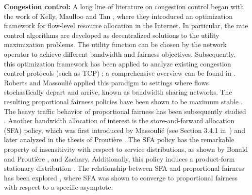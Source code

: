 \documentclass[ssy,preprint]{imsart_axv}
\numberwithin{equation}{section}
\theoremstyle{plain}
\theoremstyle{definition}
\theoremstyle{remark}
\theoremstyle{plain}
\theoremstyle{plain}
\begin{document}
\medskip
\noindent\textbf{Congestion control:} A long line of literature on congestion
control began with the work of Kelly, Maulloo and Tan \cite{kelly1998rate}, where they
introduced an optimization framework for flow-level resource allocation in
the Internet. In particular, the rate control algorithms are developed
as decentralized solutions to the utility maximization problems. The
utility function can be chosen by the network operator to achieve
different bandwidth and fairness objectives. Subsequently, this optimization
framework has been applied to analyze existing congestion control
protocols (such as TCP) \cite{low2002vegas,low2002internet,mo2000fair}; a
comprehensive overview can be found in  \cite{srikant_book}.
Roberts and Massouli\'{e} \cite{massoulie2000bandwidth} applied this
paradigm to settings where flows stochastically depart and arrive,
known as bandwidth sharing networks. The resulting proportional fairness
policies have been shown to be maximum stable \cite{bonald2001fairness,massoulie2007fairness}.
The heavy traffic behavior of proportional fairness has been subsequently
studied \cite{shah2014qualitative,kang2009diffusion}. Another bandwidth
allocation of interest is the store-and-forward allocation (SFA) policy,
which was first introduced by Massouli\'{e} (see Section 3.4.1 in~\cite{proutiere_thesis}) and
later analyzed in the thesis of Prouti\`{e}re \cite{proutiere_thesis}. The SFA policy has the remarkable
property of insensitivity with respect to service distributions,
as shown by Bonald and Prouti\`{e}re \cite{bonald2003insensitive}, and
Zachary\cite{zachary2007insensitivity}. Additionally, this policy
induces a product-form stationary distribution \cite{bonald2003insensitive}.
The relationship between SFA and proportional fairness has been explored
\cite{massoulie2007fairness}, where SFA was shown to converge to
proportional fairness with respect to a specific asymptote. 
\end{document}
